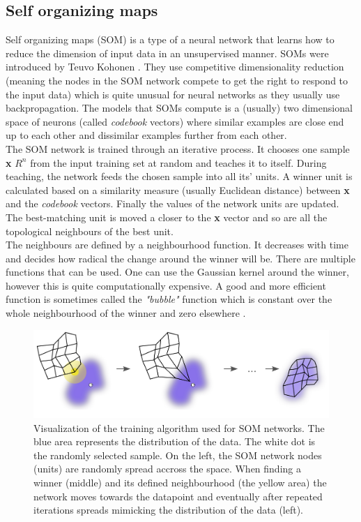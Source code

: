 \subsection{Self organizing maps}
Self organizing maps (SOM) is a type of a neural network that learns how to reduce the dimension of input data in an unsupervised manner. SOMs were introduced by Teuvo Kohonen \cite{Kohonen1982}. They use competitive dimensionality reduction (meaning the nodes in the SOM network compete to get the right to respond to the input data) which is quite unusual for neural networks as they usually use backpropagation. The models that SOMs compute is a (usually) two dimensional space of neurons (called \textit{codebook} vectors) where similar examples are close end up to each other and dissimilar examples further from each other.\\
The SOM network is trained through an iterative process. It chooses one sample \textbf{x} \in  $ R^n $ from the input training set at random and teaches it to itself. During teaching, the network feeds the chosen sample into all its' units. A winner unit is calculated based on a similarity measure (usually Euclidean distance) between \textbf{x} and the \textit{codebook} vectors. Finally the values of the network units are updated. The best-matching unit is moved a closer to the \textbf{x} vector and so are all the topological neighbours of the best unit.\\
The neighbours are defined by a neighbourhood function. It decreases with time and decides how radical the change around the winner will be. There are multiple functions that can be used. One can use the Gaussian kernel around the winner, however this is quite computationally expensive. A good and more efficient function is sometimes called the \textit{"bubble"} function which is constant over the whole neighbourhood of the winner and zero elsewhere \cite{SOM_training}.
\begin{figure}[h]
    \centering
	\includegraphics[width=140mm]{./img/Somtraining.png}
	\caption{Visualization of the training algorithm used for SOM networks. The blue area represents the distribution of the data. The white dot is the randomly selected sample. On the left, the SOM network nodes (units) are randomly spread accross the space. When finding a winner (middle) and its defined neighbourhood (the yellow area) the network moves towards the datapoint and eventually after repeated iterations spreads mimicking the distribution of the data (left).}
	\label{fig:som_training}
\end{figure}

